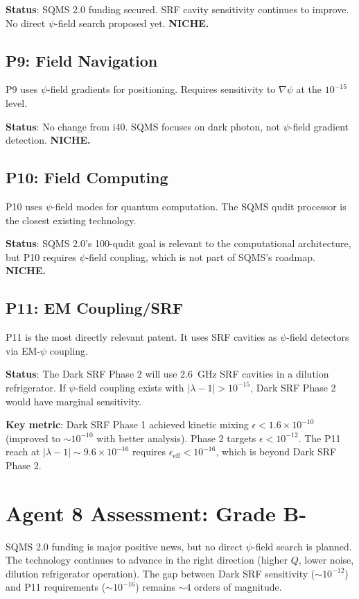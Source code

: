 \documentclass[11pt,a4paper]{article}
\begin{document}
\textbf{Status}: SQMS 2.0 funding secured. SRF cavity sensitivity continues to improve. No direct $\psi$-field search proposed yet. \textbf{NICHE.}

\subsection{P9: Field Navigation}

P9 uses $\psi$-field gradients for positioning. Requires sensitivity to $\nabla\psi$ at the $10^{-15}$ level.

\textbf{Status}: No change from i40. SQMS focuses on dark photon, not $\psi$-field gradient detection. \textbf{NICHE.}

\subsection{P10: Field Computing}

P10 uses $\psi$-field modes for quantum computation. The SQMS qudit processor is the closest existing technology.

\textbf{Status}: SQMS 2.0's 100-qudit goal is relevant to the computational architecture, but P10 requires $\psi$-field coupling, which is not part of SQMS's roadmap. \textbf{NICHE.}

\subsection{P11: EM Coupling/SRF}

P11 is the most directly relevant patent. It uses SRF cavities as $\psi$-field detectors via EM-$\psi$ coupling.

\textbf{Status}: The Dark SRF Phase 2 will use 2.6~GHz SRF cavities in a dilution refrigerator. If $\psi$-field coupling exists with $|\lambda - 1| > 10^{-15}$, Dark SRF Phase 2 would have marginal sensitivity.

\textbf{Key metric}: Dark SRF Phase 1 achieved kinetic mixing $\epsilon < 1.6 \times 10^{-10}$ (improved to $\sim 10^{-10}$ with better analysis). Phase 2 targets $\epsilon < 10^{-12}$. The P11 reach at $|\lambda - 1| \sim 9.6 \times 10^{-16}$ requires $\epsilon_{\text{eff}} < 10^{-16}$, which is beyond Dark SRF Phase 2.

\section{Agent 8 Assessment: Grade B-}

SQMS 2.0 funding is major positive news, but no direct $\psi$-field search is planned. The technology continues to advance in the right direction (higher $Q$, lower noise, dilution refrigerator operation). The gap between Dark SRF sensitivity ($\sim 10^{-12}$) and P11 requirements ($\sim 10^{-16}$) remains $\sim 4$ orders of magnitude.
\end{document}
